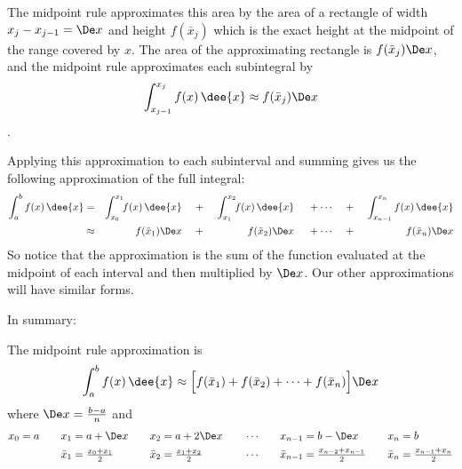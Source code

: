 The midpoint rule approximates this area by the area of a rectangle
of width $x_j-x_{j-1}=\De x$ and height $f(\bar x_j)$ which
is the exact height at the midpoint of the range covered by $x$.
The area of the approximating rectangle is $f(\bar x_j)\De x$, and the midpoint rule
approximates each subintegral by
\begin{equation*}
\int_{x_{j-1}}^{x_j} f(x)\,\dee{x}\approx f(\bar x_j)\De x
\end{equation*}.

Applying this approximation to each subinterval and summing gives us the following
approximation of the full integral:
\begin{alignat*}{7}
\int_a^b f(x)\,\dee{x}&=&
\int_{x_0}^{x_1}\!\! f(x)\,\dee{x}&&
&\ +\ &
\int_{x_1}^{x_2}\!\! f(x)\,\dee{x}&&
&\ +\cdots&
&\ +\ &
\int_{x_{n-1}}^{x_n} f(x)\,\dee{x}&   \\
&\approx&
f(\bar x_1)\De x&&
&\ +\ &
f(\bar x_2)\De x&&
&\ +\cdots&
&\ +\ &
f(\bar x_n)\De x &
\end{alignat*}
So notice that the approximation is the sum of the function evaluated at the midpoint of
each interval and then multiplied by $\De x$. Our other approximations will have similar
forms.

In summary:
\begin{impeqn}\label{eq:MPrule}
The midpoint rule approximation is
\begin{align*}
\int_a^b f(x)\,\dee{x}\approx\Big[f(\bar x_1)+f(\bar x_2)+\cdots
+f(\bar x_n)\Big]\De x
\end{align*}
where $\De x = \tfrac{b-a}{n}$ and
\begin{alignat*}{7}
x_0&=a&\quad
x_1&=a+\De x&\quad
x_2&=a+2\De x&\quad
&\cdots&\quad
x_{n-1}&=b-\De x&\quad
x_n&=b\\
& &
\bar x_1&=\tfrac{x_0+x_1}{2}&
\bar x_2&=\tfrac{x_1+x_2}{2}&
&\cdots&
\bar x_{n-1}&=\tfrac{x_{n-2}+x_{n-1}}{2}&
\bar x_n&=\tfrac{x_{n-1}+x_n}{2}
\end{alignat*}
\end{impeqn}


